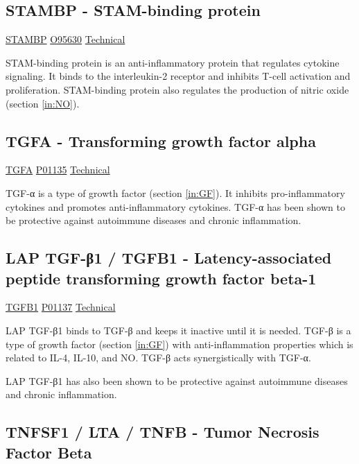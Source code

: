 \subsection{STAMBP - STAM-binding protein}

\href{https://en.wikipedia.org/wiki/STAMBP}{STAMBP}
\href{http://www.uniprot.org/uniprot/O95630}{O95630}
\href{https://olink.com/products-services/target/protein/?assayID=5114}{Technical}

STAM-binding protein is an anti-inflammatory protein that regulates cytokine signaling. It binds to the interleukin-2 receptor and inhibits T-cell activation and proliferation. STAM-binding protein also regulates the production of nitric oxide (section \ref{in:NO}).

\subsection{TGFA - Transforming growth factor alpha}

\href{https://en.wikipedia.org/wiki/TGF \textunderscore alpha}{TGFA}
\href{http://www.uniprot.org/uniprot/P01135}{P01135}
\href{https://olink.com/products-services/target/protein/?assayID=5042}{Technical}

TGF-α is a type of growth factor (section \ref{in:GF}). It inhibits pro-inflammatory cytokines and promotes anti-inflammatory cytokines. TGF-α has been shown to be protective against autoimmune diseases and chronic inflammation.

\subsection{LAP TGF-β1 / TGFB1 - Latency-associated peptide transforming growth factor beta-1}

\href{https://en.wikipedia.org/wiki/LTBP1_(gene)}{TGFB1}
\href{http://www.uniprot.org/uniprot/P01137}{P01137}
\href{https://olink.com/products-services/target/protein/?assayID=5071}{Technical}

LAP TGF-β1 binds to TGF-β and keeps it inactive until it is needed. TGF-β is a type of growth factor (section \ref{in:GF}) with anti-inflammation properties which is related to IL-4, IL-10, and NO. TGF-β acts synergistically with TGF-α.

LAP TGF-β1 has also been shown to be protective against autoimmune diseases and chronic inflammation.

\subsection{TNFSF1 / LTA / TNFB - Tumor Necrosis Factor Beta}

